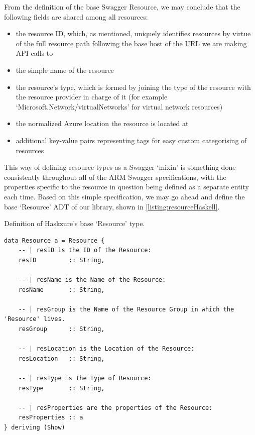 \documentclass[11pt]{report}
\begin{document}
\newpage

From the definition of the base Swagger Resource, we may conclude that the
following fields are shared among all resources:

\begin{itemize}
    \item{} the resource ID, which, as mentioned, uniquely identifies resources
        by virtue of the full resource path following the base host of the URL
        we are making API calls to
    \item{} the simple name of the resource
    \item{} the resource's type, which is formed by joining the type of the
        resource with the resource provider in charge of it (for example
        `Microsoft.Network/virtualNetworks' for virtual network resources)
    \item{} the normalized Azure location the resource is located at
    \item{} additional key-value pairs representing tags for easy custom
        categorising of resources
\end{itemize}

This way of defining resource types as a Swagger `mixin' is something done
consistently throughout all of the ARM Swagger specifications, with the
properties specific to the resource in question being defined as a separate
entity each time. Based on this simple specification, we may go ahead and
define the base `Resource' ADT of our library, shown in
\autoref{listing:resourceHaskell}.

\begin{listing}[H]
\caption{Definition of Haskzure's base `Resource' type.}
\label{listing:resourceHaskell}
\begin{verbatim}
data Resource a = Resource {
    -- | resID is the ID of the Resource:
    resID         :: String,

    -- | resName is the Name of the Resource:
    resName       :: String,

    -- | resGroup is the Name of the Resource Group in which the 'Resource' lives.
    resGroup      :: String,

    -- | resLocation is the Location of the Resource:
    resLocation   :: String,

    -- | resType is the Type of Resource:
    resType       :: String,

    -- | resProperties are the properties of the Resource:
    resProperties :: a
} deriving (Show)
\end{verbatim}
\end{listing}
\end{document}
